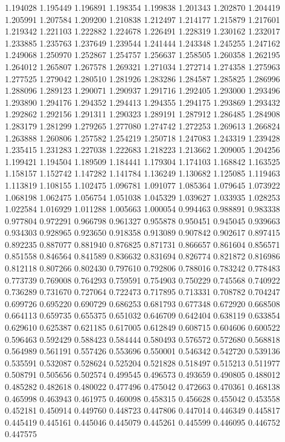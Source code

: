 1.194028
1.195449
1.196891
1.198354
1.199838
1.201343
1.202870
1.204419
1.205991
1.207584
1.209200
1.210838
1.212497
1.214177
1.215879
1.217601
1.219342
1.221103
1.222882
1.224678
1.226491
1.228319
1.230162
1.232017
1.233885
1.235763
1.237649
1.239544
1.241444
1.243348
1.245255
1.247162
1.249068
1.250970
1.252867
1.254757
1.256637
1.258505
1.260358
1.262195
1.264012
1.265807
1.267578
1.269321
1.271034
1.272714
1.274358
1.275963
1.277525
1.279042
1.280510
1.281926
1.283286
1.284587
1.285825
1.286996
1.288096
1.289123
1.290071
1.290937
1.291716
1.292405
1.293000
1.293496
1.293890
1.294176
1.294352
1.294413
1.294355
1.294175
1.293869
1.293432
1.292862
1.292156
1.291311
1.290323
1.289191
1.287912
1.286485
1.284908
1.283179
1.281299
1.279265
1.277080
1.274742
1.272253
1.269613
1.266824
1.263888
1.260806
1.257582
1.254219
1.250718
1.247083
1.243319
1.239428
1.235415
1.231283
1.227038
1.222683
1.218223
1.213662
1.209005
1.204256
1.199421
1.194504
1.189509
1.184441
1.179304
1.174103
1.168842
1.163525
1.158157
1.152742
1.147282
1.141784
1.136249
1.130682
1.125085
1.119463
1.113819
1.108155
1.102475
1.096781
1.091077
1.085364
1.079645
1.073922
1.068198
1.062475
1.056754
1.051038
1.045329
1.039627
1.033935
1.028253
1.022584
1.016929
1.011288
1.005663
1.000054
0.994463
0.988891
0.983338
0.977804
0.972291
0.966798
0.961327
0.955878
0.950451
0.945045
0.939663
0.934303
0.928965
0.923650
0.918358
0.913089
0.907842
0.902617
0.897415
0.892235
0.887077
0.881940
0.876825
0.871731
0.866657
0.861604
0.856571
0.851558
0.846564
0.841589
0.836632
0.831694
0.826774
0.821872
0.816986
0.812118
0.807266
0.802430
0.797610
0.792806
0.788016
0.783242
0.778483
0.773739
0.769008
0.764293
0.759591
0.754903
0.750229
0.745568
0.740922
0.736289
0.731670
0.727064
0.722473
0.717895
0.713331
0.708782
0.704247
0.699726
0.695220
0.690729
0.686253
0.681793
0.677348
0.672920
0.668508
0.664113
0.659735
0.655375
0.651032
0.646709
0.642404
0.638119
0.633854
0.629610
0.625387
0.621185
0.617005
0.612849
0.608715
0.604606
0.600522
0.596463
0.592429
0.588423
0.584444
0.580493
0.576572
0.572680
0.568818
0.564989
0.561191
0.557426
0.553696
0.550001
0.546342
0.542720
0.539136
0.535591
0.532087
0.528624
0.525204
0.521828
0.518497
0.515213
0.511977
0.508791
0.505656
0.502574
0.499545
0.496573
0.493659
0.490805
0.488012
0.485282
0.482618
0.480022
0.477496
0.475042
0.472663
0.470361
0.468138
0.465998
0.463943
0.461975
0.460098
0.458315
0.456628
0.455042
0.453558
0.452181
0.450914
0.449760
0.448723
0.447806
0.447014
0.446349
0.445817
0.445419
0.445161
0.445046
0.445079
0.445261
0.445599
0.446095
0.446752
0.447575
